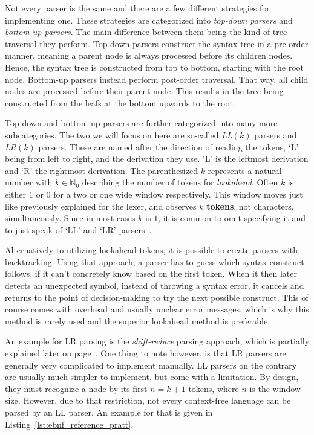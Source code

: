 Not every parser is the same and there are a few different strategies for implementing one.
These strategies are categorized into \emph{top-down parsers} and \emph{bottom-up parsers}.
The main difference between them being the kind of tree traversal they perform.
Top-down parsers construct the syntax tree in a pre-order manner, meaning a parent node is always processed before its children nodes.
Hence, the syntax tree is constructed from top to bottom, starting with the root node.
Bottom-up parsers instead perform post-order traversal.
That way, all child nodes are processed before their parent node.
This results in the tree being constructed from the leafs at the bottom upwards to the root.

Top-down and bottom-up parsers are further categorized into many more subcategories.
The two we will focus on here are so-called \emph{LL$(k)$} parsers and \emph{LR$(k)$} parsers.
These are named after the direction of reading the tokens, `L' being from left to right, and the derivation they use.
`L' is the leftmost derivation and `R' the rightmost derivation.
The parenthesized $k$ represents a natural number with $k\in\mathbb{N}_0$ describing the number of tokens for \emph{lookahead}.
Often $k$ is either $1$ or $0$ for a two or one wide window respectively.
This window moves just like previously explained for the lexer, and observes $k$ \textbf{tokens}, not characters, simultaneously.
Since in most cases $k$ is $1$, it is common to omit specifying it and to just speak of `LL' and `LR' parsers~\cite[pp.86-88]{Watson2017}.

Alternatively to utilizing lookahead tokens, it is possible to create parsers with backtracking.
Using that approach, a parser has to guess which syntax construct follows, if it can't concretely know based on the first token.
When it then later detects an unexpected symbol, instead of throwing a syntax error, it cancels and returns to the point of decision-making to try the next possible construct.
This of course comes with overhead and usually unclear error messages, which is why this method is rarely used and the superior lookahead method is preferable.

An example for LR parsing is the \emph{shift-reduce} parsing approach, which is partially explained later on page~\pageref{sec:parser_generators}.
One thing to note however, is that LR parsers are generally very complicated to implement manually.
LL parsers on the contrary are usually much simpler to implement, but come with a limitation.
By design, they must recognize a node by its first $n=k+1$ tokens, where $n$ is the window size.
However, due to that restriction, not every context-free language can be parsed by an LL parser.
An example for that is given in Listing~\ref{lst:ebnf_reference_pratt}.

